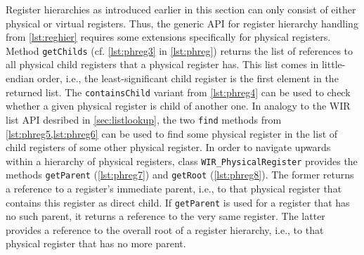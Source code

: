 Register hierarchies as introduced earlier in this section can only consist of either physical or virtual registers.
Thus, the generic \gls{API} for register hierarchy handling from \cref{lst:reghier} requires some extensions specifically for physical registers.
Method \texttt{getChilds} (cf. \cref{lst:phreg3} in \cref{lst:phreg}) returns the list of references to all physical child registers that a physical register has.
This list comes in little-endian order, i.e., the least-significant child register is the first element in the returned list.
The \texttt{containsChild} variant from \cref{lst:phreg4} can be used to check whether a given physical register is child of another one.
In analogy to the \gls{WIR} list \gls{API} desribed in \cref{sec:listlookup}, the two \texttt{find} methods from \cref{lst:phreg5,lst:phreg6} can be used to find some physical register in the list of child registers of some other physical register.
In order to navigate upwards within a hierarchy of physical registers, class \texttt{WIR\_PhysicalRegister} provides the methods \texttt{getParent} (\cref{lst:phreg7}) and \texttt{getRoot} (\cref{lst:phreg8}).
The former returns a reference to a register's immediate parent, i.e., to that physical register that contains this register as direct child.
If \texttt{getParent} is used for a register that has no such parent, it returns a reference to the very same register.
The latter provides a reference to the overall root of a register hierarchy, i.e., to that physical register that has no more parent.

